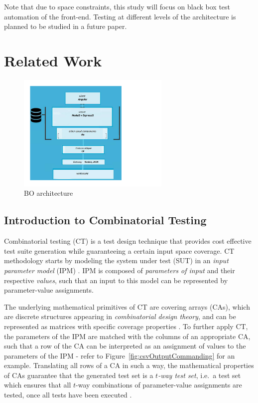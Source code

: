 \documentclass[conference]{IEEEtran}
\begin{document}
Note that due to space constraints, this study will focus on black box test automation of the front-end. Testing at different levels of the architecture is planned to be studied in a future paper. 


\section{Related Work}

	\begin{figure}[!b]
		\includegraphics[width=0.65\textwidth,]{architecture.pdf}
	\caption{BO architecture}
	\label{fig:BOIC architecture}
	\end{figure}

	\subsection{Introduction to Combinatorial Testing}
	Combinatorial testing (CT) is a test design technique that provides cost effective test suite generation
	while guaranteeing a certain input space coverage.
	CT methodology starts by modeling the system under test (SUT) in an \emph{input parameter model} (IPM) \cite{OffuttIPM}.
	IPM is composed of \emph{parameters of input} and their respective \emph{values},
	such that an input to this model can be represented by parameter-value assignments.
	
	The underlying mathematical primitives of CT are covering arrays (CAs), which are discrete structures appearing in \emph{combinatorial design theory},
	and can be represented as matrices with specific coverage properties \cite{NISTpractical}.
	To further apply CT, the parameters of the IPM are matched with the columns of an appropriate CA,
	such that a row of the CA can be interpreted as an assignment of values to the parameters of the IPM - refer to Figure~\ref{fig:csvOutputCommanding} for an example.
	Translating all rows of a CA in such a way, the mathematical properties of CAs guarantee that the generated test set
	is a \emph{$t$-way test set}, i.e.\ a test set which ensures that all $t$-way combinations of parameter-value assignments are tested,
	once all tests have been executed \cite{NISTpractical}.
	
\end{document}

